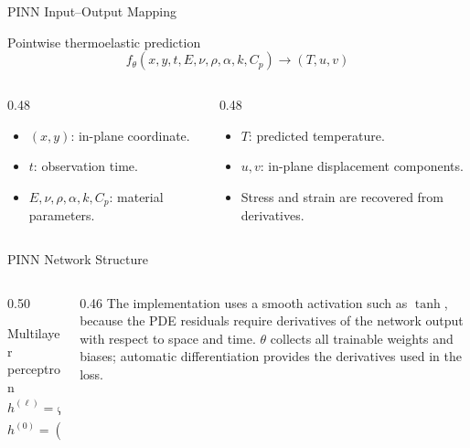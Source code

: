 \begin{frame}{PINN Input--Output Mapping}
  \begin{block}{Pointwise thermoelastic prediction}
    \[
      f_{\theta}(x,y,t,E,\nu,\rho,\alpha,k,C_p)\rightarrow(T,u,v)
    \]
  \end{block}
  \begin{columns}[T]
    \begin{column}{0.48\textwidth}
      \footnotesize
      \begin{itemize}
        \item $(x,y)$: in-plane coordinate.
        \item $t$: observation time.
        \item $E,\nu,\rho,\alpha,k,C_p$: material parameters.
      \end{itemize}
    \end{column}
    \begin{column}{0.48\textwidth}
      \footnotesize
      \begin{itemize}
        \item $T$: predicted temperature.
        \item $u,v$: in-plane displacement components.
        \item Stress and strain are recovered from derivatives.
      \end{itemize}
    \end{column}
  \end{columns}
\end{frame}

\begin{frame}{PINN Network Structure}
  \begin{columns}[T]
    \begin{column}{0.50\textwidth}
      \begin{block}{Multilayer perceptron}
        \[
          h^{(\ell)}=\varphi\left(W^{(\ell)}h^{(\ell-1)}+b^{(\ell)}\right)
        \]
        \[
          h^{(0)}=(x,y,t,E,\nu,\rho,\alpha,k,C_p)
        \]
      \end{block}
    \end{column}
    \begin{column}{0.46\textwidth}
      \footnotesize
      The implementation uses a smooth activation such as $\tanh$, because the
      PDE residuals require derivatives of the network output with respect to
      space and time.
      \vskip 4pt
      \scriptsize
      $\theta$ collects all trainable weights and biases; automatic
      differentiation provides the derivatives used in the loss.
    \end{column}
  \end{columns}
\end{frame}

